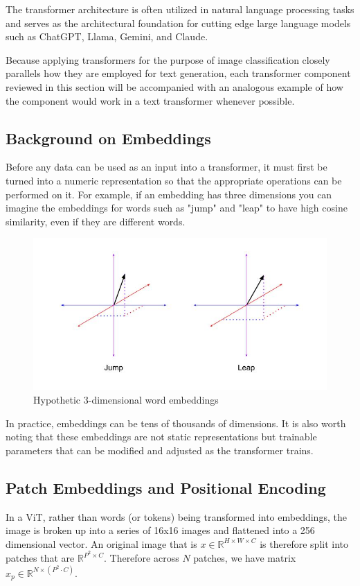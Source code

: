 \documentclass [MS] {uclathes}
\begin{document}
The transformer architecture is often utilized in natural language processing tasks and serves as the 
architectural foundation for cutting edge large language models such as ChatGPT, Llama, Gemini, and Claude. 

Because applying transformers for the purpose of image classification closely parallels how they are employed for text
generation, each transformer component reviewed in this section will be accompanied with an analogous example of how the
component would work in a text transformer whenever possible.

\subsection{Background on Embeddings}
Before any data can be used as an input into a transformer, it must first be turned into a numeric representation so 
that the appropriate operations can be performed on it. For example, if an embedding has three dimensions you can 
imagine the embeddings for words such as "jump" and "leap" to have high cosine similarity, even if they are different 
words.

\begin{figure} [H]
    \centering
    \includegraphics[width=1\linewidth]{figures/Cosine Similarity Example.jpg}
    \caption{Hypothetic 3-dimensional word embeddings}
    \label{fig:hypothetical word embeddings}
\end{figure}

In practice, embeddings can be tens of thousands of dimensions. It is also worth noting that these embeddings are not 
static representations but trainable parameters that can be modified and adjusted as the transformer trains. 

\subsection{Patch Embeddings and Positional Encoding}
In a ViT, rather than words (or tokens) being transformed into embeddings, the image is broken up into a series of 16x16
images and flattened into a 256 dimensional vector. An original image that is \(x \in \mathbb{R}^{H \times W \times C}\)
is therefore split into patches that are  \(\mathbb{R}^{P^2 \times C}\). Therefore across \(N\) patches, we have matrix
\(x_p \in \mathbb{R}^{N \times (P^2 \cdot C)}\).
\end{document}
